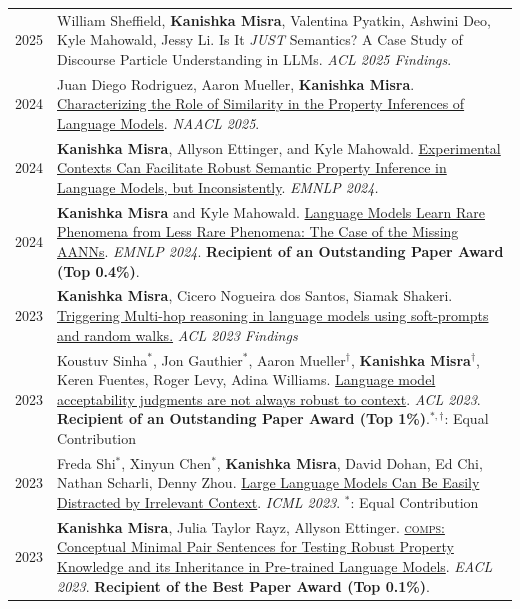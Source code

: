 \documentclass[11pt]{article}
\begin{document}
\begin{longtable}{p{}  p{} }
2025 & William Sheffield, \textbf{Kanishka Misra}, Valentina Pyatkin, Ashwini Deo, Kyle Mahowald, Jessy Li. Is It \emph{JUST} Semantics? A Case Study of Discourse Particle Understanding in LLMs. \textit{ACL 2025 Findings}.\\

2024 & Juan Diego Rodriguez, Aaron Mueller, \textbf{Kanishka Misra}. \href{https://arxiv.org/abs/2410.22590}{Characterizing the Role of Similarity in the Property Inferences of Language Models}. \textit{NAACL 2025}.\\

2024 & \textbf{Kanishka Misra}, Allyson Ettinger, and Kyle Mahowald. \href{https://arxiv.org/abs/2401.06640v1}{Experimental Contexts Can Facilitate Robust Semantic Property Inference in Language Models, but Inconsistently}. \textit{EMNLP 2024.}\\

2024 & \textbf{Kanishka Misra} and Kyle Mahowald. \href{https://arxiv.org/abs/2403.19827}{Language Models Learn Rare Phenomena from Less Rare Phenomena: The Case of the Missing AANNs}. \textit{EMNLP 2024}. \textcolor{award}{\textbf{Recipient of an Outstanding Paper Award (Top 0.4\%)}}.\\

2023 & \textbf{Kanishka Misra}, Cicero Nogueira dos Santos, Siamak Shakeri. \href{https://aclanthology.org/2023.findings-acl.62/}{Triggering Multi-hop reasoning in language models using soft-prompts and random walks.} \textit{ACL 2023 Findings}\\

2023 & Koustuv Sinha$^{*}$, Jon Gauthier$^{*}$, Aaron Mueller$^{\dagger}$, \textbf{Kanishka Misra}$^{\dagger}$, Keren Fuentes, Roger Levy, Adina Williams. \href{https://aclanthology.org/2023.acl-long.333/}{Language model acceptability judgments are not always robust to context}. \textit{ACL 2023}. \textcolor{award}{\textbf{Recipient of an Outstanding Paper Award (Top 1\%)}}.$^{*,\dagger}$: Equal Contribution\\

2023 & Freda Shi$^{*}$, Xinyun Chen$^{*}$, \textbf{Kanishka Misra}, David Dohan, Ed Chi, Nathan Scharli, Denny Zhou. \href{https://proceedings.mlr.press/v202/shi23a.html}{Large Language Models Can Be Easily Distracted by Irrelevant Context}. \textit{ICML 2023}. $^{*}$: Equal Contribution\\

2023 & \textbf{Kanishka Misra}, Julia Taylor Rayz, Allyson Ettinger. \href{https://aclanthology.org/2023.eacl-main.213}{\textsc{comps}: Conceptual Minimal Pair Sentences for Testing Robust Property Knowledge and its Inheritance in Pre-trained Language Models}. \textit{EACL 2023}. \textbf{\textcolor{award}{Recipient of the Best Paper Award (Top 0.1\%)}}.\\


\end{longtable}
\end{document}
